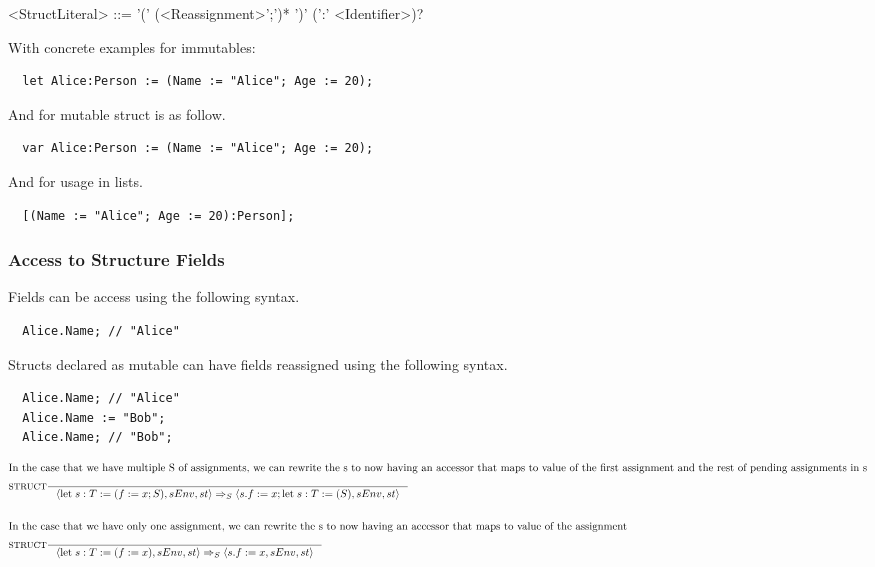 \begin{grammar}
<StructLiteral> ::= '(' (<Reassignment>';')* ')' (':' <Identifier>)?
\end{grammar}


With concrete examples for immutables:

\begin{verbatim}
  let Alice:Person := (Name := "Alice"; Age := 20);
\end{verbatim}

And for mutable struct is as follow.

\begin{verbatim}
  var Alice:Person := (Name := "Alice"; Age := 20);
\end{verbatim}

And for usage in lists.

\begin{verbatim}
  [(Name := "Alice"; Age := 20):Person];
\end{verbatim}

\subsubsection{Access to Structure Fields}
\label{sec:accessStructFields}

Fields can be access using the following syntax.

\begin{verbatim}
  Alice.Name; // "Alice"
\end{verbatim}

Structs declared as mutable can have fields reassigned using the following syntax.

\begin{verbatim}
  Alice.Name; // "Alice"
  Alice.Name := "Bob";
  Alice.Name; // "Bob";
\end{verbatim}

\begin{align*}
\intertext{In the case that we have multiple S of assignments, we can rewrite the s to now having an accessor that maps to value of the first assignment and the rest of pending assignments in s}
&\inference[$\text{STRUCT}$]{}
                            {\Braket{\Tlet \; s:T := (f := x;S),sEnv,st} \Rightarrow_S \Braket{s.f := x;\Tlet \; s:T := (S),sEnv,st}}
\\\\
\intertext{In the case that we have only one assignment, we can rewrite the s to now having an accessor that maps to value of the assignment}
&\inference[$\text{STRUCT}$]{}
                            {\Braket{\Tlet \; s:T := (f := x),sEnv,st} \Rightarrow_S \Braket{s.f := x,sEnv,st}}
\end{align*}

